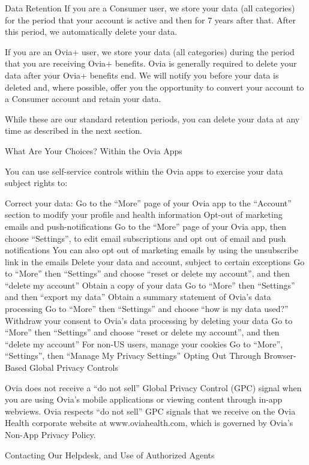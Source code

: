 Data Retention
If you are a Consumer user, we store your data (all categories) for the period that your account is active and then for 7 years after that. After this period, we automatically delete your data. 

If you are an Ovia+ user, we store your data (all categories) during the period that you are receiving Ovia+ benefits. Ovia is generally required to delete your data after your Ovia+ benefits end. We will notify you before your data is deleted and, where possible, offer you the opportunity to convert your account to a Consumer account and retain your data.

While these are our standard retention periods, you can delete your data at any time as described in the next section.

What Are Your Choices?
Within the Ovia Apps

You can use self-service controls within the Ovia apps to exercise your data subject rights to:

Correct your data:
Go to the “More” page of your Ovia app to the “Account” section to modify your profile and health information
Opt-out of marketing emails and push-notifications
Go to the “More” page of your Ovia app, then choose “Settings”, to edit email subscriptions and opt out of email and push notifications
You can also opt out of marketing emails by using the unsubscribe link in the emails
Delete your data and account, subject to certain exceptions
Go to “More” then “Settings” and choose “reset or delete my account”, and then “delete my account”
Obtain a copy of your data
Go to “More” then “Settings” and then “export my data”
Obtain a summary statement of Ovia’s data processing
Go to “More” then “Settings” and choose “how is my data used?”
Withdraw your consent to Ovia’s data processing by deleting your data
Go to “More” then “Settings” and choose “reset or delete my account”, and then “delete my account”
For non-US users, manage your cookies
Go to “More”, “Settings”, then “Manage My Privacy Settings”
Opting Out Through Browser-Based Global Privacy Controls

Ovia does not receive a “do not sell” Global Privacy Control (GPC) signal when you are using Ovia’s mobile applications or viewing content through in-app webviews. Ovia respects “do not sell” GPC signals that we receive on the Ovia Health corporate website at www.oviahealth.com, which is governed by Ovia’s Non-App Privacy Policy.

Contacting Our Helpdesk, and Use of Authorized Agents

